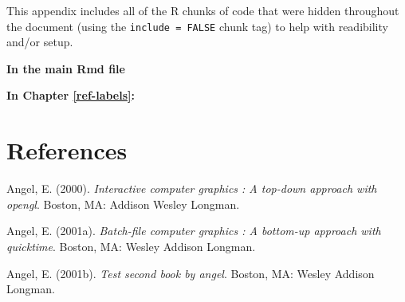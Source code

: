 \documentclass[12pt,twoside]{dukestatscithesis}
\theoremstyle{definition}
\theoremstyle{definition}
\theoremstyle{definition}
\theoremstyle{remark}
\begin{document}
This appendix includes all of the R chunks of code that were hidden
throughout the document (using the \texttt{include\ =\ FALSE} chunk tag)
to help with readibility and/or setup.

\textbf{In the main Rmd file}
\begin{Shaded}
\begin{Highlighting}[]
  \NormalTok{(}\NormalTok{, } \NormalTok{)}
  \NormalTok{(}\NormalTok{)}
\end{Highlighting}
\end{Shaded}
\textbf{In Chapter \ref{ref-labels}:}

\backmatter

\chapter*{References}\label{references}


\noindent

\setlength{\parindent}{-0.20in} \setlength{\leftskip}{0.20in}
\setlength{\parskip}{8pt}

\hypertarget{refs}{}
\hypertarget{ref-angel2000}{}
Angel, E. (2000). \emph{Interactive computer graphics : A top-down
approach with opengl}. Boston, MA: Addison Wesley Longman.

\hypertarget{ref-angel2001}{}
Angel, E. (2001a). \emph{Batch-file computer graphics : A bottom-up
approach with quicktime}. Boston, MA: Wesley Addison Longman.

\hypertarget{ref-angel2002a}{}
Angel, E. (2001b). \emph{Test second book by angel}. Boston, MA: Wesley
Addison Longman.


\end{document}
